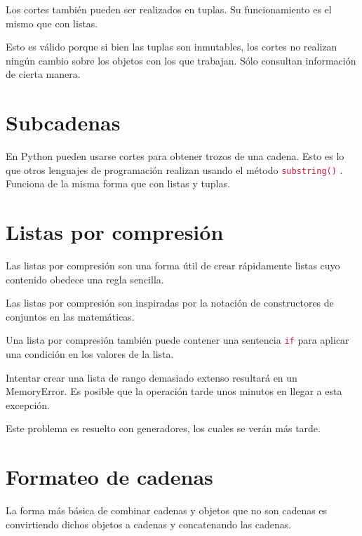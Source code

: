 \documentclass{report}
\newcommand{\ttt}[1]{
  \textcolor{Crimson}{\texttt{#1}}
}
\begin{document}
Los cortes también pueden ser realizados en tuplas. Su funcionamiento es el mismo que con listas.


Esto es válido porque si bien las tuplas son inmutables, los cortes no realizan ningún cambio sobre los objetos con los que trabajan. Sólo consultan información de cierta manera.

\section{Subcadenas}

En Python pueden usarse cortes para obtener trozos de una cadena. Esto es lo que otros lenguajes de programación realizan usando el método \ttt{substring()}. Funciona de la misma forma que con listas y tuplas.


\section{Listas por compresión}

Las listas por compresión son una forma útil de crear rápidamente listas cuyo contenido obedece una regla sencilla.


Las listas por compresión son inspiradas por la notación de constructores de conjuntos en las matemáticas.\smallskip

Una lista por compresión también puede contener una sentencia \ttt{if} para aplicar una condición en los valores de la lista.


Intentar crear una lista de rango demasiado extenso resultará en un MemoryError. Es posible que la operación tarde unos minutos en llegar a esta excepción.


Este problema es resuelto con generadores, los cuales se verán más tarde.

\section{Formateo de cadenas}

La forma más básica de combinar cadenas y objetos que no son cadenas es convirtiendo dichos objetos a cadenas y concatenando las cadenas.\smallskip
\end{document}
